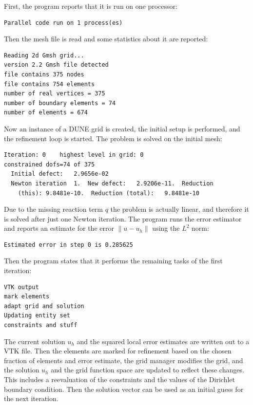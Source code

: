 \documentclass[a4paper,12pt]{article}
\begin{document}
First, the program reports that it is run on one processor:
\begin{lstlisting}[basicstyle=\ttfamily\small,
frame=single,
backgroundcolor=\color{listingbg}]
Parallel code run on 1 process(es)
\end{lstlisting}
Then the mesh file is read and some statistics about it are reported:
\begin{lstlisting}[basicstyle=\ttfamily\small,
frame=single,
backgroundcolor=\color{listingbg}]
Reading 2d Gmsh grid...
version 2.2 Gmsh file detected
file contains 375 nodes
file contains 754 elements
number of real vertices = 375
number of boundary elements = 74
number of elements = 674
\end{lstlisting}
Now an instance of a DUNE grid is created, the initial setup is performed,
and the refinement loop is started. The problem is solved on the initial
mesh:
\begin{lstlisting}[basicstyle=\ttfamily\small,
frame=single,
backgroundcolor=\color{listingbg}]
Iteration: 0	highest level in grid: 0
constrained dofs=74 of 375
  Initial defect:   2.9656e-02
  Newton iteration  1.  New defect:   2.9206e-11.  Reduction
    (this): 9.8481e-10.  Reduction (total):   9.8481e-10
\end{lstlisting}
Due to the missing reaction term $q$ the problem is actually linear, and
therefore it is solved after just one Newton iteration. The program
runs the error estimator and reports an estimate for the error
$\|u - u_h\|$ using the $L^2$ norm:
\begin{lstlisting}[basicstyle=\ttfamily\small,
frame=single,
backgroundcolor=\color{listingbg}]
Estimated error in step 0 is 0.285625
\end{lstlisting}
Then the program states that it performs the remaining tasks of the
first iteration:
\begin{lstlisting}[basicstyle=\ttfamily\small,
frame=single,
backgroundcolor=\color{listingbg}]
VTK output
mark elements
adapt grid and solution
Updating entity set
constraints and stuff
\end{lstlisting}
The current solution $u_h$ and the squared local error estimates are
written out to a VTK file. Then the elements are marked for refinement
based on the chosen fraction of elements and error estimate, the grid
manager modifies the grid, and the solution $u_h$ and the grid function
space are updated to reflect these changes. This includes a reevaluation
of the constraints and the values of the Dirichlet boundary condition.
Then the solution vector can be used as an initial guess for the next
iteration.
\end{document}

